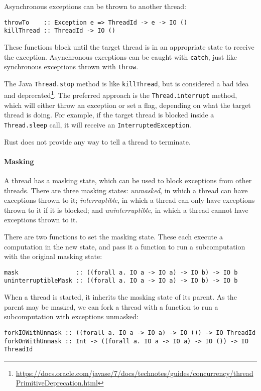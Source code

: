 Asynchronous exceptions can be thrown to another thread:

\begin{verbatim}
throwTo    :: Exception e => ThreadId -> e -> IO ()
killThread :: ThreadId -> IO ()
\end{verbatim}

These functions block until the target thread is in an appropriate state to
receive the exception.  Asynchronous exceptions can be caught with \verb|catch|,
just like synchronous exceptions thrown with \verb|throw|.

The Java \verb|Thread.stop| method is like \verb|killThread|, but is
considered a bad idea and
deprecated\footnote{\url{https://docs.oracle.com/javase/7/docs/technotes/guides/concurrency/threadPrimitiveDeprecation.html}}.
The preferred approach is the \verb|Thread.interrupt| method, which
will either throw an exception or set a flag, depending on what the
target thread is doing.  For example, if the target thread is blocked
inside a \verb|Thread.sleep| call, it will receive an
\verb|InterruptedException|.

Rust does not provide any way to tell a thread to terminate.

\paragraph{Masking}
A thread has a masking state, which can be used to block exceptions
from other threads.  There are three masking states: \emph{unmasked},
in which a thread can have exceptions thrown to it;
\emph{interruptible}, in which a thread can only have exceptions
thrown to it if it is blocked; and \emph{uninterruptible}, in which a
thread cannot have exceptions thrown to it.

There are two functions to set the masking state.  These each execute a
computation in the new state, and pass it a function to run a subcomputation
with the original masking state:

\begin{verbatim}
mask                :: ((forall a. IO a -> IO a) -> IO b) -> IO b
uninterruptibleMask :: ((forall a. IO a -> IO a) -> IO b) -> IO b
\end{verbatim}

When a thread is started, it inherits the masking state of its parent.  As the
parent may be masked, we can fork a thread with a function to run a
subcomputation with exceptions unmasked:

\begin{verbatim}
forkIOWithUnmask :: ((forall a. IO a -> IO a) -> IO ()) -> IO ThreadId
forkOnWithUnmask :: Int -> ((forall a. IO a -> IO a) -> IO ()) -> IO ThreadId
\end{verbatim}

